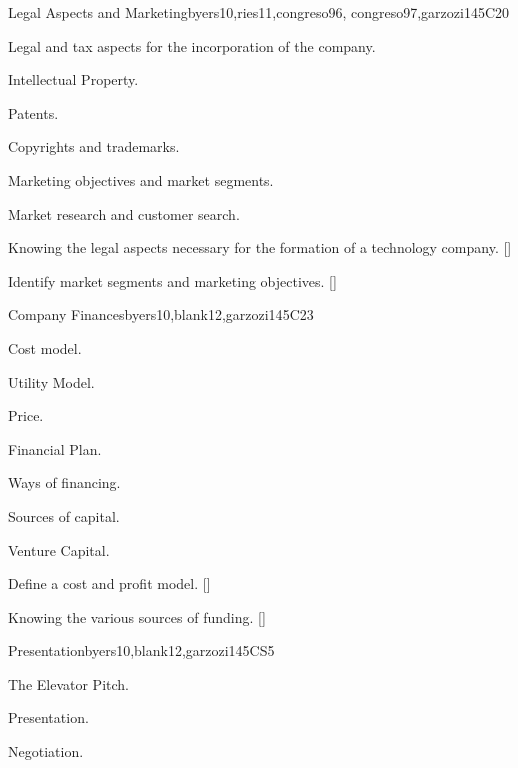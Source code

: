 \begin{syllabus}
   \begin{unit}{}{Legal Aspects and Marketing}{byers10,ries11,congreso96, congreso97,garzozi14}{5}{C20}
      \begin{topics}
         \item Legal and tax aspects for the incorporation of the company.
         \item Intellectual Property.
         \item Patents.
         \item Copyrights and trademarks.
         \item Marketing objectives and market segments.
         \item Market research and customer search.
      \end{topics}
   
     \begin{learningoutcomes} 
         \item Knowing the legal aspects necessary for the formation of a technology company. [\Familiarity]
         \item Identify market segments and marketing objectives. [\Familiarity]
      \end{learningoutcomes} 
   \end{unit}
   
   \begin{unit}{}{Company Finances}{byers10,blank12,garzozi14}{5}{C23}
      \begin{topics}
         \item Cost model.
         \item Utility Model.
         \item Price.
         \item Financial Plan.
         \item Ways of financing.
         \item Sources of capital.
         \item Venture Capital.
      \end{topics}
   
      \begin{learningoutcomes} 
         \item Define a cost and profit model. [\Assessment]
         \item Knowing the various sources of funding. [\Familiarity]
      \end{learningoutcomes} 
   \end{unit}
   
   \begin{unit}{}{Presentation}{byers10,blank12,garzozi14}{5}{CS5}
      \begin{topics}
         \item The Elevator Pitch.
         \item Presentation.
         \item Negotiation.
       \end{topics}
   

\end{unit}
\end{syllabus}
